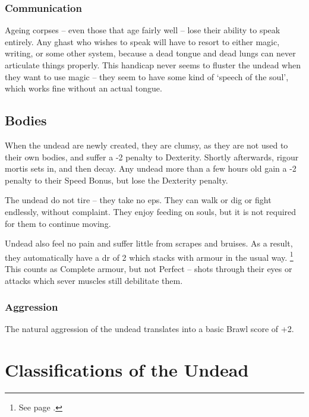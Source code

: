 \begin{multicols}{2}
\subsubsection{Communication}
\label{dead_communication}

Ageing corpses -- even those that age fairly well -- lose their ability to speak entirely.
Any ghast who wishes to speak will have to resort to either magic, writing, or some other system, because a dead tongue and dead lungs can never articulate things properly.
This handicap never seems to fluster the undead when they want to use magic -- they seem to have some kind of `speech of the soul', which works fine without an actual tongue.

\subsection{Bodies}

When the undead are newly created, they are clumsy, as they are not used to their own bodies, and suffer a -2 penalty to Dexterity.
Shortly afterwards, rigour mortis sets in, and then decay.
Any undead more than a few hours old gain a -2 penalty to their Speed Bonus, but lose the Dexterity penalty.

The undead do not tire -- they take no \glspl{ep}.
They can walk or dig or fight endlessly, without complaint.
They enjoy feeding on souls, but it is not required for them to continue moving.

Undead also feel no pain and suffer little from scrapes and bruises.
As a result, they automatically have a \gls{dr} of 2 which stacks with armour in the usual way.%
\footnote{See page \pageref{stackingarmour}.}
This counts as Complete armour, but not Perfect -- shots through their eyes or attacks which sever muscles still debilitate them.

\subsubsection{Aggression}
The natural aggression of the undead translates into a basic Brawl score of +2.

\end{multicols}

\section{Classifications of the Undead}

